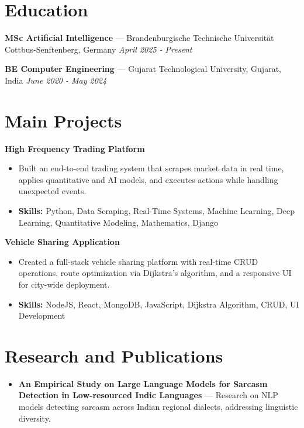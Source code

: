 \documentclass[a4paper,10pt]{article}
\begin{document}
\section*{Education}
\textbf{MSc Artificial Intelligence} — Brandenburgische Technische Universität Cottbus-Senftenberg, Germany \hfill \textit{April 2025 - Present}\par
\vspace{1.5pt}
\textbf{BE Computer Engineering} — Gujarat Technological University, Gujarat, India \hfill \textit{June 2020 - May 2024}\par

\section*{Main Projects}
\textbf{High Frequency Trading Platform}\par
\vspace{1pt}
\begin{itemize}
  \item Built an end-to-end trading system that scrapes market data in real time, applies quantitative and AI models, and executes actions while handling unexpected events.
  \item \textbf{Skills:} Python, Data Scraping, Real-Time Systems, Machine Learning, Deep Learning, Quantitative Modeling, Mathematics, Django
\end{itemize}
\vspace{3pt}
\textbf{Vehicle Sharing Application}\par
\vspace{1pt}
\begin{itemize}
  \item Created a full-stack vehicle sharing platform with real-time CRUD operations, route optimization via Dijkstra's algorithm, and a responsive UI for city-wide deployment.
  \item \textbf{Skills:} NodeJS, React, MongoDB, JavaScript, Dijkstra Algorithm, CRUD, UI Development
\end{itemize}

\section*{Research and Publications}
\begin{itemize}
\item \textbf{An Empirical Study on Large Language Models for Sarcasm Detection in Low-resourced Indic Languages} — Research on NLP models detecting sarcasm across Indian regional dialects, addressing linguistic diversity.
\end{itemize}
\end{document}
